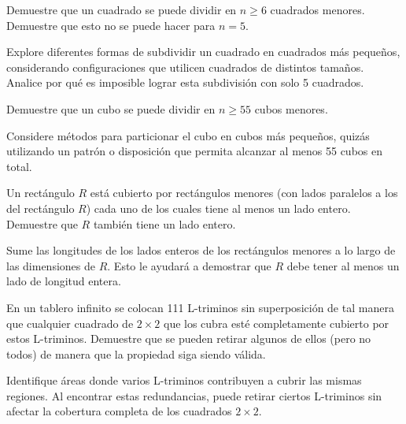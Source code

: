 \documentclass[11pt]{scrartcl}
\begin{document}
\begin{problem}
Demuestre que un cuadrado se puede dividir en \(n \geq 6\) cuadrados menores. Demuestre que esto no se puede hacer para \(n = 5\).
\begin{hint}
Explore diferentes formas de subdividir un cuadrado en cuadrados más pequeños, considerando configuraciones que utilicen cuadrados de distintos tamaños. Analice por qué es imposible lograr esta subdivisión con solo 5 cuadrados.
\end{hint}
\end{problem}

\begin{problem}[Rumania 1978] Demuestre que un cubo se puede dividir en \(n \geq 55\) cubos menores.
\begin{hint}
Considere métodos para particionar el cubo en cubos más pequeños, quizás utilizando un patrón o disposición que permita alcanzar al menos 55 cubos en total.
\end{hint}
\end{problem}

\begin{problem}
Un rectángulo \(R\) está cubierto por rectángulos menores (con lados paralelos a los del rectángulo \(R\)) cada uno de los cuales tiene al menos un lado entero. Demuestre que \(R\) también tiene un lado entero.
\begin{hint}
Sume las longitudes de los lados enteros de los rectángulos menores a lo largo de las dimensiones de \(R\). Esto le ayudará a demostrar que \(R\) debe tener al menos un lado de longitud entera.
\end{hint}
\end{problem}

\begin{problem} En un tablero infinito se colocan 111 L-triminos sin superposición de tal manera que cualquier cuadrado de \(2 \times 2\) que los cubra esté completamente cubierto por estos L-triminos. Demuestre que se pueden retirar algunos de ellos (pero no todos) de manera que la propiedad siga siendo válida.
\begin{hint}
Identifique áreas donde varios L-triminos contribuyen a cubrir las mismas regiones. Al encontrar estas redundancias, puede retirar ciertos L-triminos sin afectar la cobertura completa de los cuadrados \(2 \times 2\).
\end{hint}
\end{problem}
\end{document}
